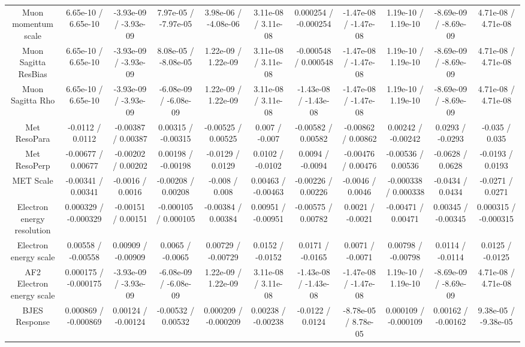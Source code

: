 \begin{table}[htbp]
\begin{center}
\begin{tabular}{|c|c|c|c|c|c|c|c|c|c|c|}
  Muon momentum scale & 6.65e-10 / 6.65e-10 & -3.93e-09 / -3.93e-09 & 7.97e-05 / -7.97e-05 & 3.98e-06 / -4.08e-06 & 3.11e-08 / 3.11e-08 & 0.000254 / -0.000254 & -1.47e-08 / -1.47e-08 & 1.19e-10 / 1.19e-10 & -8.69e-09 / -8.69e-09 & 4.71e-08 / 4.71e-08 \\ 
  Muon Sagitta ResBias & 6.65e-10 / 6.65e-10 & -3.93e-09 / -3.93e-09 & 8.08e-05 / -8.08e-05 & 1.22e-09 / 1.22e-09 & 3.11e-08 / 3.11e-08 & -0.000548 / 0.000548 & -1.47e-08 / -1.47e-08 & 1.19e-10 / 1.19e-10 & -8.69e-09 / -8.69e-09 & 4.71e-08 / 4.71e-08 \\ 
  Muon Sagitta Rho & 6.65e-10 / 6.65e-10 & -3.93e-09 / -3.93e-09 & -6.08e-09 / -6.08e-09 & 1.22e-09 / 1.22e-09 & 3.11e-08 / 3.11e-08 & -1.43e-08 / -1.43e-08 & -1.47e-08 / -1.47e-08 & 1.19e-10 / 1.19e-10 & -8.69e-09 / -8.69e-09 & 4.71e-08 / 4.71e-08 \\ 
  Met ResoPara & -0.0112 / 0.0112 & -0.00387 / 0.00387 & 0.00315 / -0.00315 & -0.00525 / 0.00525 & 0.007 / -0.007 & -0.00582 / 0.00582 & -0.00862 / 0.00862 & 0.00242 / -0.00242 & 0.0293 / -0.0293 & -0.035 / 0.035 \\ 
  Met ResoPerp & -0.00677 / 0.00677 & -0.00202 / 0.00202 & 0.00198 / -0.00198 & -0.0129 / 0.0129 & 0.0102 / -0.0102 & 0.0094 / -0.0094 & -0.00476 / 0.00476 & -0.00536 / 0.00536 & -0.0628 / 0.0628 & -0.0193 / 0.0193 \\ 
  MET Scale & -0.00341 / 0.00341 & -0.0016 / 0.0016 & -0.00208 / 0.00208 & -0.008 / 0.008 & 0.00463 / -0.00463 & -0.00226 / 0.00226 & -0.0046 / 0.0046 & -0.000338 / 0.000338 & -0.0434 / 0.0434 & -0.0271 / 0.0271 \\ 
  Electron energy resolution & 0.000329 / -0.000329 & -0.00151 / 0.00151 & -0.000105 / 0.000105 & -0.00384 / 0.00384 & 0.00951 / -0.00951 & -0.00575 / 0.00782 & 0.0021 / -0.0021 & -0.00471 / 0.00471 & 0.00345 / -0.00345 & 0.000315 / -0.000315 \\ 
  Electron energy scale & 0.00558 / -0.00558 & 0.00909 / -0.00909 & 0.0065 / -0.0065 & 0.00729 / -0.00729 & 0.0152 / -0.0152 & 0.0171 / -0.0165 & 0.0071 / -0.0071 & 0.00798 / -0.00798 & 0.0114 / -0.0114 & 0.0125 / -0.0125 \\ 
  AF2 Electron energy scale & 0.000175 / -0.000175 & -3.93e-09 / -3.93e-09 & -6.08e-09 / -6.08e-09 & 1.22e-09 / 1.22e-09 & 3.11e-08 / 3.11e-08 & -1.43e-08 / -1.43e-08 & -1.47e-08 / -1.47e-08 & 1.19e-10 / 1.19e-10 & -8.69e-09 / -8.69e-09 & 4.71e-08 / 4.71e-08 \\ 
  BJES Response & 0.000869 / -0.000869 & 0.00124 / -0.00124 & -0.00532 / 0.00532 & 0.000209 / -0.000209 & 0.00238 / -0.00238 & -0.0122 / 0.0124 & -8.78e-05 / 8.78e-05 & 0.000109 / -0.000109 & 0.00162 / -0.00162 & 9.38e-05 / -9.38e-05 \\ 

\end{tabular}
\end{center}
\end{table}

